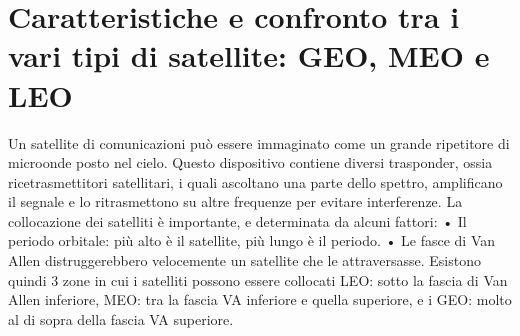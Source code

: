 \section{Caratteristiche e confronto tra i vari tipi di satellite: GEO, MEO e LEO}

Un satellite di comunicazioni può essere immaginato come un grande ripetitore di microonde posto nel cielo. Questo dispositivo contiene diversi trasponder, ossia ricetrasmettitori satellitari, i quali ascoltano una parte dello spettro, amplificano il segnale e lo ritrasmettono su altre frequenze per evitare interferenze.
La collocazione dei satelliti è importante, e determinata da alcuni fattori:
•	Il periodo orbitale: più alto è il satellite, più lungo è il periodo.
•	Le fasce di Van Allen distruggerebbero velocemente un satellite che le attraversasse.
Esistono quindi 3 zone in cui i satelliti possono essere collocati LEO: sotto la fascia di Van Allen inferiore, MEO: tra la fascia VA inferiore e quella superiore, e i GEO: molto al di sopra della fascia VA superiore.
 
